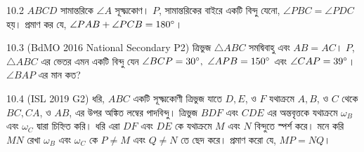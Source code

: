 \documentclass[12pt]{article}
\begin{document}
\begin{prob} {10.2}
    $ABCD$ সামান্তরিকে $\angle A$ সূক্ষ্মকোণ। $P$, সামান্তরিকের বাইরে একটি বিন্দু যেনো, $\angle PBC = \angle PDC$ হয়।
    প্রমাণ কর যে, $\angle PAB + \angle PCB = 180^\circ$।
\end{prob}

\begin{prob} {10.3 (BdMO 2016 National Secondary P2)}
    ত্রিভুজ $\triangle ABC$ সমদ্বিবাহু এবং $AB=AC$। $P$, $\triangle ABC$ এর ভেতর এমন একটি বিন্দু যেন $\angle BCP = 30^\circ,\ \angle APB = 150^\circ$ এবং $\angle CAP = 39^\circ$। $\angle BAP$ এর মান কত? 
\end{prob}

\begin{prob} {10.4 (ISL 2019 G2)}
    ধরি, $ABC$ একটি সূক্ষ্মকোণী ত্রিভুজ যাতে $D, E$, ও $F$ যথাক্রমে $A, B$, ও $C$ থেকে $BC, CA$, 
    ও $AB$, এর উপর অঙ্কিত লম্বের পাদবিন্দু। ত্রিভুজ $BDF$ এবং $CDE$ এর অন্তবৃত্তকে যথাক্রমে $\omega_B$ 
    এবং $\omega_C$ দ্বারা চিহ্নিত করি। ধরি এরা $DF$ এবং $DE$ কে যথাক্রমে $M$ এবং $N$ বিন্দুতে স্পর্শ 
    করে। মনে করি $MN$ রেখা $\omega_B$ এবং $\omega_C$ কে $P \ne M$ এবং $Q \ne N$ তে ছেদ করে। 
    প্রমাণ করো যে, $MP = NQ$।
\end{prob}
\end{document}
